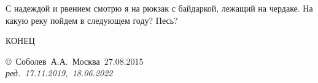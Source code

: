 С надеждой и рвением смотрю я на рюкзак с байдаркой, лежащий на чердаке. На какую реку пойдем в следующем году? Песь?
\begin{center}
\end{center}

\begin{center}
	\Large {КОНЕЦ}
\end{center}
\vspace{\fill}
\begin{flushright}
	\copyright~Соболев~А.А.~Москва~27.08.2015\\
	\textit{ред.~17.11.2019,~18.06.2022}
\end{flushright}



